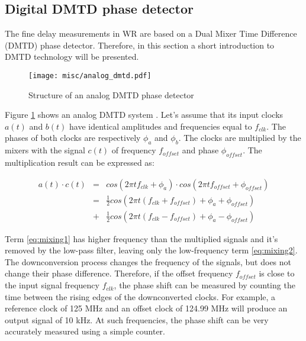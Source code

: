 \subsection{Digital DMTD phase detector}
\label{s:dmtd}
The fine delay measurements in WR are based on a Dual Mixer Time Difference
(DMTD) phase detector. Therefore, in this section a short introduction to
DMTD technology will be presented.
\begin{figure}[ht!]
  \centering
  \texttt{[image: misc/analog\_dmtd.pdf]}
  \caption{Structure of an analog DMTD phase detector}
  \label{fig:analog_dmtd}
\end{figure}
Figure \ref{fig:analog_dmtd} shows an analog DMTD system \cite{allan90}. Let's
assume that its input clocks $a(t)$ and $b(t)$ have identical amplitudes and
frequencies equal to $f_{clk}$. The phases of both clocks are respectively
$\phi_{a}$ and $\phi_{b}$. The clocks are multiplied by the mixers with
the signal $c(t)$ of frequency $f_{offset}$ and phase $\phi_{offset}$. The
multiplication result can be expressed as:

\begin{eqnarray}
    a(t) \cdot c(t) & = & cos(2\pi t f_{clk} + \phi_{a}) \cdot cos (2\pi t
    f_{offset} + \phi_{offset}) \nonumber \\
\label{eq:mixing1}& = & \frac{1}{2} cos(2\pi t (f_{clk} + f_{offset}) +
\phi_a + \phi_{offset}) \\
\label{eq:mixing2}& + & \frac{1}{2} cos (2 \pi t (f_{clk} - f_{offset}) +
\phi_a - \phi_{offset})
\end{eqnarray}

Term \ref{eq:mixing1} has higher frequency than the multiplied signals and
it's removed by the low-pass filter, leaving only the low-frequency term
\ref{eq:mixing2}. The downconversion process changes the frequency of the
signals, but does not change their phase difference. Therefore, if the offset
frequency $f_{offset}$ is close to the input signal frequency $f_{clk}$,
the phase shift can be measured by counting the time between the rising
edges of the downconverted clocks. For example, a reference clock of 125
MHz and an offset clock of 124.99 MHz will produce an output signal of 10
kHz. At such frequencies, the phase shift can be very accurately measured
using a simple counter.

